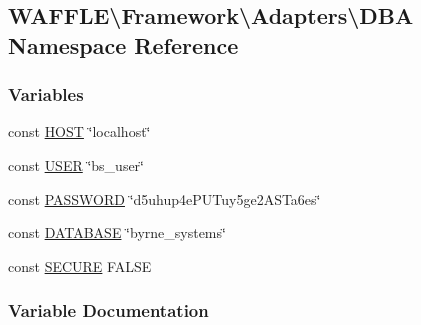 \hypertarget{namespace_w_a_f_f_l_e_1_1_framework_1_1_adapters_1_1_d_b_a}{}\subsection{W\+A\+F\+F\+LE\textbackslash{}Framework\textbackslash{}Adapters\textbackslash{}D\+BA Namespace Reference}
\label{namespace_w_a_f_f_l_e_1_1_framework_1_1_adapters_1_1_d_b_a}
\subsubsection*{Variables}
\begin{DoxyCompactItemize}
\item 
const \hyperlink{namespace_w_a_f_f_l_e_1_1_framework_1_1_adapters_1_1_d_b_a_a6768772c01f2d4f111fabd25012e8259}{H\+O\+ST} \char`\"{}localhost\char`\"{}
\item 
const \hyperlink{namespace_w_a_f_f_l_e_1_1_framework_1_1_adapters_1_1_d_b_a_a1bbff5b87a1e3a8d402d50c9fdb4e6e9}{U\+S\+ER} \char`\"{}bs\+\_\+user\char`\"{}
\item 
const \hyperlink{namespace_w_a_f_f_l_e_1_1_framework_1_1_adapters_1_1_d_b_a_a627633cf1f3c4ee60fcc7d025a4039ed}{P\+A\+S\+S\+W\+O\+RD} \char`\"{}d5uhup4e\+P\+U\+Tuy5ge2\+A\+S\+Ta6es\char`\"{}
\item 
const \hyperlink{namespace_w_a_f_f_l_e_1_1_framework_1_1_adapters_1_1_d_b_a_a671e180a0a9486e82d3f3ccb1f4761f6}{D\+A\+T\+A\+B\+A\+SE} \char`\"{}byrne\+\_\+systems\char`\"{}
\item 
const \hyperlink{namespace_w_a_f_f_l_e_1_1_framework_1_1_adapters_1_1_d_b_a_afdb2746446e63b60d3e42dc8777e6aaf}{S\+E\+C\+U\+RE} F\+A\+L\+SE
\end{DoxyCompactItemize}


\subsubsection{Variable Documentation}
\mbox{\label{namespace_w_a_f_f_l_e_1_1_framework_1_1_adapters_1_1_d_b_a_a671e180a0a9486e82d3f3ccb1f4761f6}} 
